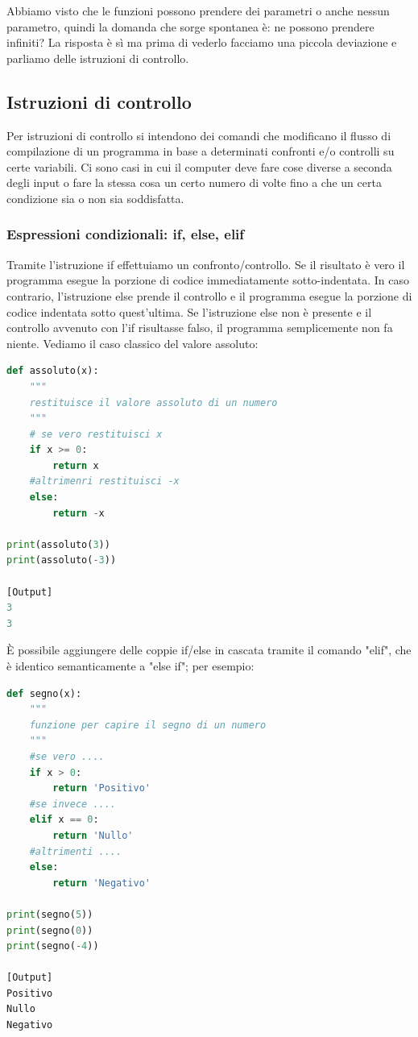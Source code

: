 \documentclass[10pt,a4paper]{article}
\begin{document}
Abbiamo visto che le funzioni possono prendere dei parametri o anche nessun parametro, quindi la domanda che sorge spontanea è: ne possono prendere infiniti? La risposta è sì ma prima di vederlo facciamo una piccola deviazione e parliamo delle istruzioni di controllo.

\subsection{Istruzioni di controllo}
Per istruzioni di controllo si intendono dei comandi che modificano il flusso di compilazione di un programma in base a determinati confronti e/o controlli su certe variabili. Ci sono casi in cui il computer deve fare cose diverse a seconda degli input o fare la stessa cosa un certo numero di volte fino a che un certa condizione sia o non sia soddisfatta.
\subsubsection{Espressioni condizionali: if, else, elif}
Tramite l'istruzione if effettuiamo un confronto/controllo. Se il risultato è vero il programma esegue la porzione di codice immediatamente sotto-indentata. In caso contrario, l'istruzione else prende il controllo e il programma esegue la porzione di codice indentata sotto quest'ultima. Se l'istruzione else non è presente e il controllo avvenuto con l'if risultasse falso, il programma semplicemente non fa niente. Vediamo il caso classico del valore assoluto:

\begin{lstlisting}[language=Python]
def assoluto(x):
    """
    restituisce il valore assoluto di un numero
    """
    # se vero restituisci x
    if x >= 0:          
        return x
    #altrimenri restituisci -x
    else:
        return -x

print(assoluto(3))
print(assoluto(-3))

[Output]
3
3
\end{lstlisting}
È possibile aggiungere delle coppie if/else in cascata tramite il comando "elif", che è identico semanticamente a "else if"; per esempio:

\begin{lstlisting}[language=Python]
def segno(x):
    """
    funzione per capire il segno di un numero
    """
    #se vero ....
    if x > 0:
        return 'Positivo'
    #se invece ....
    elif x == 0: 
        return 'Nullo'
    #altrimenti ....
    else:
        return 'Negativo'

print(segno(5))
print(segno(0))
print(segno(-4))

[Output]
Positivo
Nullo
Negativo

\end{lstlisting}
\end{document}
